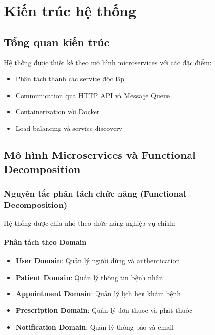 \documentclass[12pt,a4paper]{report}
\begin{document}
    \chapter{Kiến trúc hệ thống}

    \section{Tổng quan kiến trúc}
    Hệ thống được thiết kế theo mô hình microservices với các đặc điểm:
    \begin{itemize}
        \item Phân tách thành các service độc lập
        \item Communication qua HTTP API và Message Queue
        \item Containerization với Docker
        \item Load balancing và service discovery
    \end{itemize}

    \section{Mô hình Microservices và Functional Decomposition}

    \subsection{Nguyên tắc phân tách chức năng (Functional Decomposition)}
    Hệ thống được chia nhỏ theo chức năng nghiệp vụ chính:

    \subsubsection{Phân tách theo Domain}
    \begin{itemize}
        \item \textbf{User Domain}: Quản lý người dùng và authentication
        \item \textbf{Patient Domain}: Quản lý thông tin bệnh nhân
        \item \textbf{Appointment Domain}: Quản lý lịch hẹn khám bệnh
        \item \textbf{Prescription Domain}: Quản lý đơn thuốc và phát thuốc
        \item \textbf{Notification Domain}: Quản lý thông báo và email
    \end{itemize}
\end{document}
